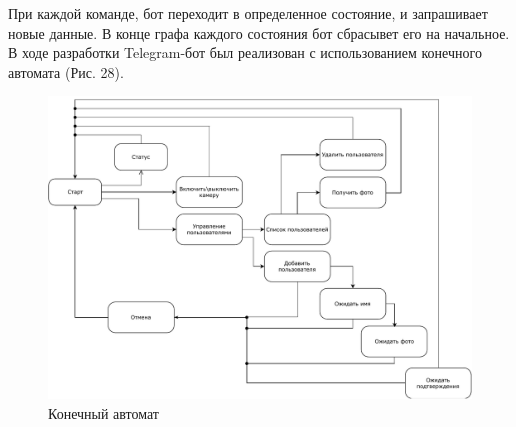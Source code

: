 При каждой команде, бот переходит в определенное состояние, и запрашивает новые
данные. В конце графа каждого состояния бот сбрасывет его на начальное. В ходе
разработки Telegram-бот был реализован с использованием конечного автомата
\cite{finite-state-machine} (Рис. 28).


\begin{figure}[h!]
  \centering
  \setlength{\fboxsep}{5pt}
  \includegraphics[width=1\textwidth]{data-visualisation/state-machine}
  \vspace*{6pt}
  \caption{Конечный автомат}\label{fig:state-machine}
\end{figure}
